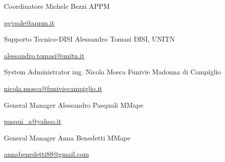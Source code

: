 

\begin{cventries}

  \cventry
    {Coordinatore} %
    {Michele Bezzi} %
    {APPM} %
    {} %
    {
      \begin{cvitems} %
        \item {\href{mailto:pgvsole@appm.it}{pgvsole@appm.it}}
      \end{cvitems}
    }

  \cventry
    {Supporto Tecnico-DISI} %
    {Alessandro Tomasi} %
    {DISI, UNITN} %
    {} %
    {
      \begin{cvitems} %
        \item {\href{mailto:alessandro.tomasi@unitn.it}{alessandro.tomasi@unitn.it}}
      \end{cvitems}
    }

  \cventry
    {System Administrator} %
    {ing. Nicola Mosca} %
    {Funivie Madonna di Campiglio} %
    {} %
    {
      \begin{cvitems} %
        \item {\href{mailto:nicola.mosca@funiviecampiglio.it}{nicola.mosca@funiviecampiglio.it}}
      \end{cvitems}
    }

  \cventry
    {General Manager} %
    {Alessandro Pasquali} %
    {MMape} %
    {} %
    {
      \begin{cvitems} %
        \item {\href{mailto:pasqui\_a@yahoo.it}{pasqui\_a@yahoo.it}}
      \end{cvitems}
    }


  \cventry
    {General Manager} %
    {Anna Benedetti} %
    {MMape} %
    {} %
    {
      \begin{cvitems} %
        \item {\href{mailto:annabenedetti88@gmail.com}{annabenedetti88@gmail.com}}
      \end{cvitems}
    }
 
\end{cventries}
